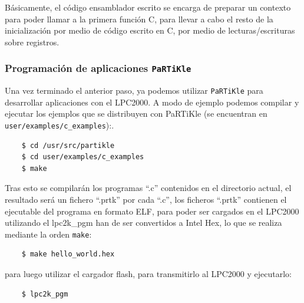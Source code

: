 \documentclass[10pt,a4paper]{article}
\newcommand{\partikle}[0]{\texttt{PaRTiKle}}
\begin{document}
	Básicamente, el código ensamblador escrito se encarga de preparar un contexto para poder llamar a la primera función C, para llevar a cabo el resto de la inicialización por medio de código escrito en C, por medio de lecturas/escrituras sobre registros.
		
	\subsubsection{Programación de aplicaciones \partikle{}}
	
	Una vez terminado el anterior paso, ya podemos utilizar \partikle{} para desarrollar aplicaciones con el LPC2000.
	A modo de ejemplo podemos compilar y ejecutar los ejemplos que se distribuyen con PaRTiKle (se encuentran en \texttt{user/\-examples/\-c\_examples}):.
	
	\begin{verbatim}
	$ cd /usr/src/partikle
	$ cd user/examples/c_examples
	$ make
	\end{verbatim}
	
	Tras esto se compilarán los programas ``.c'' contenidos en el directorio actual, el resultado será un fichero ``.prtk'' por cada ``.c'', los ficheros ``.prtk'' contienen el ejecutable del programa en formato ELF, para poder ser cargados en el LPC2000 utilizando el lpc2k\_pgm han de ser convertidos a Intel Hex, lo que se realiza mediante la orden \texttt{make}:

	\begin{verbatim}
	$ make hello_world.hex
	\end{verbatim}
	
	para luego utilizar el cargador flash, para transmitirlo al LPC2000 y ejecutarlo:

	\begin{verbatim}
	$ lpc2k_pgm
	\end{verbatim}
	
\newpage


\end{document}

